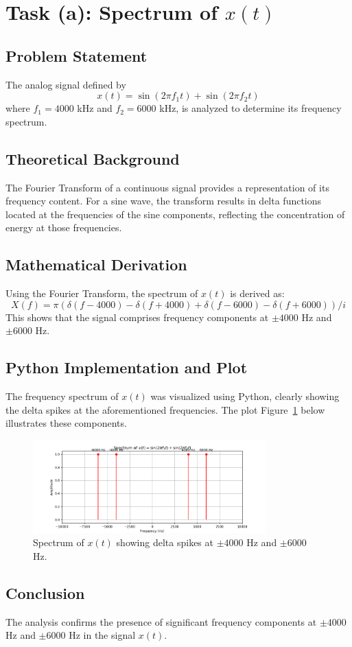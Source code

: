 
\item[(a)]
\section*{Task (a): Spectrum of \(x(t)\)}

\subsection*{Problem Statement}
The analog signal defined by
\[
x(t) = \sin(2\pi f_1 t) + \sin(2\pi f_2 t)
\]
where \(f_1 = 4000\) kHz and \(f_2 = 6000\) kHz, is analyzed to determine its frequency spectrum.

\subsection*{Theoretical Background}
The Fourier Transform of a continuous signal provides a representation of its frequency content.
For a sine wave, the transform results in delta functions located at the frequencies of the sine components,
reflecting the concentration of energy at those frequencies.

\subsection*{Mathematical Derivation}
Using the Fourier Transform, the spectrum of \(x(t)\) is derived as:
\[
X(f) = \pi \left(\delta(f - 4000) - \delta(f + 4000) + \delta(f - 6000) - \delta(f + 6000)\right) / i
\]
This shows that the signal comprises frequency components at \(\pm 4000\) Hz and \(\pm 6000\) Hz.

\subsection*{Python Implementation and Plot}
The frequency spectrum of \(x(t)\) was visualized using Python, clearly showing the delta spikes at the aforementioned frequencies.
The plot Figure~\ref{fig:spectrum} below illustrates these components.

\begin{figure}[h]
    \centering
    \includegraphics[width=0.8\textwidth]{fig/ex1_a_spectrum}
    \caption{Spectrum of \(x(t)\) showing delta spikes at \(\pm 4000\) Hz and \(\pm 6000\) Hz.}
    \label{fig:spectrum}
\end{figure}

\subsection*{Conclusion}
The analysis confirms the presence of significant frequency components at \(\pm 4000\) Hz and \(\pm 6000\) Hz in the signal \(x(t)\).